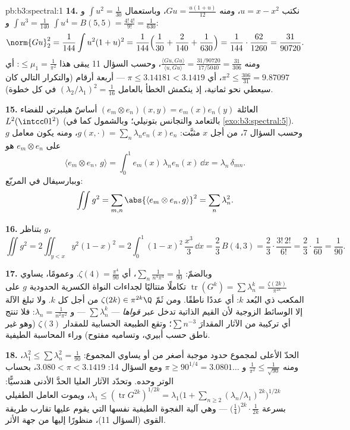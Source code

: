 \begin{solution}{pb:b3:spectral:1}
\textbf{14.} نكتب $u = x - x^2$، ومنه $Gu =
\frac{u(1 + u)}{12}$، وباستعمال
$\int u^2 = \frac1{30}$ و $\int u^3 = \frac1{140}$ و $\int u^4 = B(5,5) =
\frac{4!\,4!}{9!} = \frac1{630}$:
\[
\norm{Gu}_2^2 = \frac1{144}\int u^2(1+u)^2 =
\frac1{144}\Bigl(\frac1{30} + \frac2{140} +
\frac1{630}\Bigr) = \frac1{144}\cdot\frac{62}{1260} =
\frac{31}{90720} .
\]
ومنه $\frac{\langle Gu, Gu\rangle}{\langle u, Gu\rangle} =
\frac{31/90720}{17/5040} = \frac{31}{306}$، وحسب السؤال 11 يبقى هذا $\leq \mu_1 = \frac1{\pi^2}$: أي $\pi^2 \leq
\frac{306}{31} = 9.87097$، أي
$\pi \leq 3.14181 <
3.1419$ --- أربعة أرقام (والتكرار التالي كان سيعطي نحو ثمانية،
إذ ينكمش الخطأ بالعامل $(\lambda_2/\lambda_1)^2 = \frac1{16}$ في كل خطوة).

\textbf{15.} العائلة $(e_m \otimes e_n)(x,y) =
e_m(x)e_n(y)$ أساسٌ هيلبرتي للفضاء $L^2(\intcc01^2)$
(بالتعامد والتجانس بتونيلي؛ وبالشمول كما في \cref{exo:b3:spectral:5}).
وحسب السؤال 7، من أجل $x$ مثبَّت: $g(x, \cdot) = \sum_n\lambda_ne_n(x)e_n$، ومنه يكون معامل $g$
على $e_m\otimes e_n$ هو
\[
\langle e_m\otimes e_n,\ g\rangle
= \int_0^1 e_m(x)\,\lambda_n e_n(x)\,\dd x
= \lambda_n\,\delta_{mn} .
\]
وببارسيفال في المربّع:
\[
\iint g^2 = \sum_{m,n}\abs{\langle e_m\otimes e_n,
g\rangle}^2 = \sum_n\lambda_n^2 .
\]

\textbf{16.} بتناظر $g$،
\[
\iint g^2 = 2\iint_{y<x}y^2(1-x)^2
= 2\int_0^1(1-x)^2\,\frac{x^3}3\,\dd x
= \frac23\,B(4, 3) = \frac23\cdot\frac{3!\,2!}{6!}
= \frac23\cdot\frac1{60} = \frac1{90} .
\]

\textbf{17.} وبالضمّ: $\sum_n\frac1{n^4\pi^4} =
\frac1{90}$، أي $\zeta(4) = \frac{\pi^4}{90}$. وعمومًا، يساوي
$\operatorname{tr}(G^k) = \sum\lambda_n^k =
\frac{\zeta(2k)}{\pi^{2k}}$ تكاملًا متتاليًا لجداءات النواة الكسرية الحدودية $g$
على المكعب ذي البُعد $k$: أي عددًا ناطقًا. ومن ثَمّ $\zeta(2k) \in
\pi^{2k}\Q$ من
أجل كل $k$. ولا تبلغ الآلة إلا الوسائط الزوجية لأن القيم الذاتية
تدخل عبر \emph{قواها} --- $\sum\lambda_n^k$ --- و $\lambda_n =
\frac1{n^2\pi^2}$: فلا تنتج أي
تركيبة من الآثار المقدارَ $\sum
n^{-3}$؛ وتقع الطبيعة الحسابية للمقدار
$\zeta(3)$ (وهو غير ناطق حسب أبيري، وتساميه مفتوح) وراء
المحاسبة الطيفية.

\textbf{18.} الحدّ الأعلى لمجموع حدود موجبة أصغر من أو يساوي
المجموع: $\lambda_1^2 \leq \sum\lambda_n^2 =
\frac1{90}$، ومنه $\frac1{\pi^2} \leq \frac1{\sqrt{90}}$ و $\pi \geq 90^{1/4} = 3.0801\ldots$ ومع السؤال 14:
$3.080 < \pi < 3.1419$، بحساب الوتر وحده. وتحدّد الآثار العليا الحدَّ الأدنى
هندسيًّا: $\lambda_1 \leq (\operatorname{tr}G^{2k})^{1/2k} =
\lambda_1\bigl(1 + \sum_{n\geq2}(\lambda_n/\lambda_1)^{2k}
\bigr)^{1/2k}$، ويموت العامل الطفيلي بسرعة $\bigl(\tfrac14\bigr)^{2k}\cdot\frac1{2k}$ --- وهي
آلية الفجوة الطيفية نفسها التي يقوم عليها تقارب طريقة القوى
(السؤال 11)، منظورًا إليها من جهة الأثر.


\end{solution}
